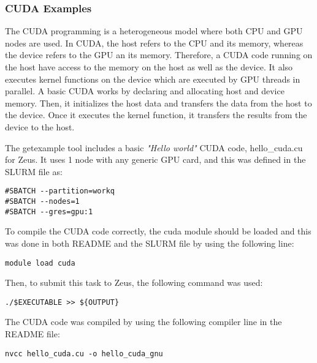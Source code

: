 \subsubsection{CUDA Examples}

The CUDA programming is a heterogeneous model where both CPU and GPU nodes are used. In CUDA, the host refers to the CPU and its memory, whereas the 
device refers to the GPU an its memory. Therefore, a CUDA code running on the host have access to the memory on the host as well as the device. It also 
executes kernel functions on the device which are executed by GPU threads in parallel. A basic CUDA works by declaring and allocating host and device 
memory. Then, it initializes the host data and transfers the data from the host to the device. Once it executes the kernel function, it transfers the 
results from the device to the host.

The getexample tool includes a basic \emph{"Hello world"} CUDA code, hello\_cuda.cu for Zeus. It uses 1 node with any generic GPU card, and this was 
defined in the SLURM file as:

\begin{tcolorbox}
\begin{Verbatim}[fontsize=\scriptsize]
#SBATCH --partition=workq
#SBATCH --nodes=1
#SBATCH --gres=gpu:1
\end{Verbatim}
\end{tcolorbox}

To compile the CUDA code correctly, the cuda module should be loaded and this was done in both README and the SLURM file by using the following line:

\begin{tcolorbox}
\begin{Verbatim}[fontsize=\scriptsize]
module load cuda
\end{Verbatim}
\end{tcolorbox}

Then, to submit this task to Zeus, the following command was used:

\begin{tcolorbox}
\begin{Verbatim}[fontsize=\scriptsize]
./$EXECUTABLE >> ${OUTPUT}
\end{Verbatim}
\end{tcolorbox}

The CUDA code was compiled by using the following compiler line in the README file:

\begin{tcolorbox}
\begin{Verbatim}[fontsize=\scriptsize]
nvcc hello_cuda.cu -o hello_cuda_gnu
\end{Verbatim}
\end{tcolorbox}

